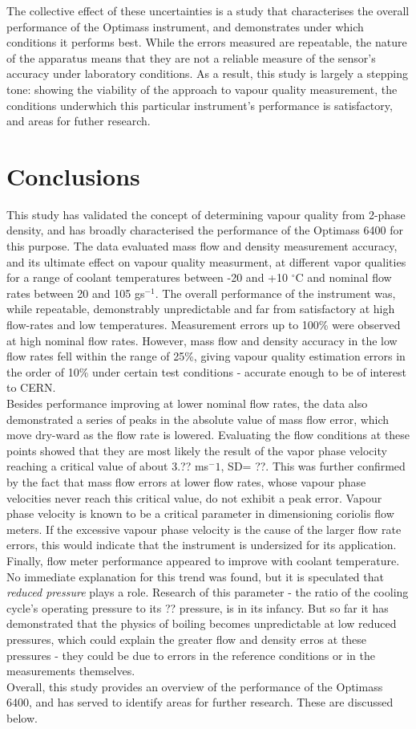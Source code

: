 \documentclass{report}
\begin{document}
The collective effect of these uncertainties is a study that characterises the overall performance of the Optimass instrument, and demonstrates under which conditions it performs best. While the errors measured are repeatable, the nature of the apparatus means that they are not a reliable measure of the sensor's accuracy under laboratory conditions. As a result, this study is largely a stepping tone: showing the viability of the approach to vapour quality measurement, the conditions underwhich this particular instrument's performance is satisfactory, and areas for futher research.
\chapter{Conclusions}
This study has validated the concept of determining vapour quality from 2-phase density, and has broadly characterised the performance of the Optimass 6400 for this purpose. The data evaluated mass flow and density measurement accuracy, and its ultimate effect on vapour quality measurment, at different vapor qualities for a range of coolant temperatures between -20 and +10 $^\circ$C and nominal flow rates between 20 and 105 gs$^{-1}$. The overall performance of the instrument was, while repeatable, demonstrably unpredictable and far from satisfactory at high flow-rates and low temperatures. Measurement errors up to 100\% were observed at high nominal flow rates. However, mass flow and density accuracy in the low flow rates fell within the range of 25\%, giving vapour quality estimation errors in the order of 10\% under certain test conditions - accurate enough to be of interest to CERN.\\
Besides performance improving at lower nominal flow rates, the data also demonstrated a series of peaks in the absolute value of mass flow error, which move dry-ward as the flow rate is lowered. Evaluating the flow conditions at these points showed that they are most likely the result of the vapor phase velocity reaching a critical value of about 3.?? ms$^-1$, SD= ??. This was further confirmed by the fact that mass flow errors at lower flow rates, whose vapour phase velocities never reach this critical value, do not exhibit a peak error. Vapour phase velocity is known to be a critical parameter in dimensioning coriolis flow meters. If the excessive vapour phase velocity is the cause of the larger flow rate errors, this would indicate that the instrument is undersized for its application.\\
Finally, flow meter performance appeared to improve with coolant temperature. No immediate explanation for this trend was found, but it is speculated that \textit{reduced pressure} plays a role. Research of this parameter - the ratio of the cooling cycle's operating pressure to its ?? pressure, is in its infancy. But so far it has demonstrated that the physics of boiling becomes unpredictable at low reduced pressures, which could explain the greater flow and density erros at these pressures - they could be due to errors in the reference conditions or in the measurements themselves.\\
Overall, this study provides an overview of the performance of the Optimass 6400, and has served to identify areas for further research. These are discussed below.
\end{document}
